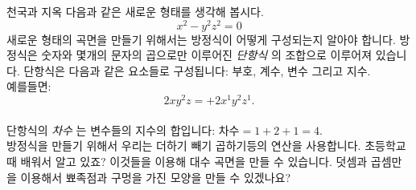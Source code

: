 ﻿\begin{surferPage}{천국과 지옥}
다음과 같은 새로운 형태를 생각해 봅시다. \\
\smallskip
\[x^2	- y^2z^2	= 0\]
\singlespacing
새로운 형태의 곡면을 만들기 위해서는 방정식이 어떻게 구성되는지 알아야 합니다. 방정식은 숫자와 몇개의 문자의 곱으로만 이루어진 {\it 단항식} 의 조합으로 이루어져 있습니다.
\singlespacing
단항식은 다음과 같은 요소들로 구성됩니다:
부호, 계수, 변수 그리고 지수. \\
\singlespacing
예를들면: 
\smallskip
\[2xy^2z = +2x^1y^2z^1.\]
\\
\smallskip
단항식의 {\it 차수} 는 변수들의 지수의 합입니다: $차수 = 1+2+1=4$.  \\
\singlespacing
방정식을 만들기 위해서 우리는 더하기 빼기 곱하기등의 연산을 사용합니다. 초등학교 때 배워서 알고 있죠? 이것들을 이용해 대수 곡면을 만들 수 있습니다.   
\singlespacing
덧셈과 곱셈만을 이용해서 뾰족점과 구멍을 가진 모양을 만들 수 있겠나요?
\end{surferPage}
